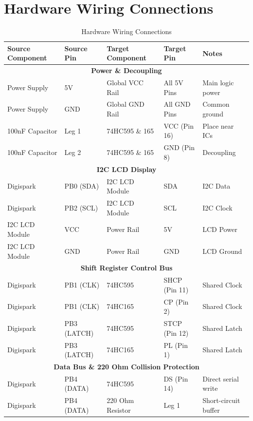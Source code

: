 \documentclass[conference]{IEEEtran}
\begin{document}
\section{Hardware Wiring Connections}

\begin{table}[htbp]
\centering
\caption{Hardware Wiring Connections}
\renewcommand{\arraystretch}{1.2}
\begin{tabular}{|l|l|l|l|l|}
\hline
\textbf{Source Component} & \textbf{Source Pin} & \textbf{Target Component} & \textbf{Target Pin} & \textbf{Notes} \\
\hline
\hline
\multicolumn{5}{|c|}{\textbf{Power \& Decoupling}} \\
\hline
Power Supply & 5V & Global VCC Rail & All 5V Pins & Main logic power \\
\hline
Power Supply & GND & Global GND Rail & All GND Pins & Common ground \\
\hline
100nF Capacitor & Leg 1 & 74HC595 \& 165 & VCC (Pin 16) & Place near ICs \\
\hline
100nF Capacitor & Leg 2 & 74HC595 \& 165 & GND (Pin 8) & Decoupling \\
\hline
\hline
\multicolumn{5}{|c|}{\textbf{I2C LCD Display}} \\
\hline
Digispark & PB0 (SDA) & I2C LCD Module & SDA & I2C Data \\
\hline
Digispark & PB2 (SCL) & I2C LCD Module & SCL & I2C Clock \\
\hline
I2C LCD Module & VCC & Power Rail & 5V & LCD Power \\
\hline
I2C LCD Module & GND & Power Rail & GND & LCD Ground \\
\hline
\hline
\multicolumn{5}{|c|}{\textbf{Shift Register Control Bus}} \\
\hline
Digispark & PB1 (CLK) & 74HC595 & SHCP (Pin 11) & Shared Clock \\
\hline
Digispark & PB1 (CLK) & 74HC165 & CP (Pin 2) & Shared Clock \\
\hline
Digispark & PB3 (LATCH) & 74HC595 & STCP (Pin 12) & Shared Latch \\
\hline
Digispark & PB3 (LATCH) & 74HC165 & PL (Pin 1) & Shared Latch \\
\hline
\hline
\multicolumn{5}{|c|}{\textbf{Data Bus \& 220 Ohm Collision Protection}} \\
\hline
Digispark & PB4 (DATA) & 74HC595 & DS (Pin 14) & Direct serial write \\
\hline
Digispark & PB4 (DATA) & 220 Ohm Resistor & Leg 1 & Short-circuit buffer \\

\end{tabular}
\end{table}
\end{document}
